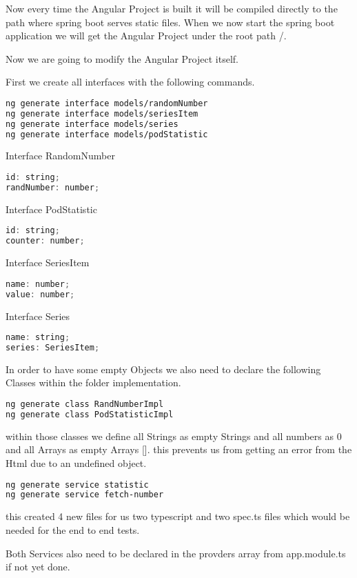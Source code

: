 Now every time the Angular Project is built it will be compiled directly to the path where spring boot serves static files.
When we now start the spring boot application we will get the Angular Project under the root path /.

Now we are going to modify the Angular Project itself.

First we create all interfaces with the following commands.
\begin{lstlisting}[language=Bash]
ng generate interface models/randomNumber
ng generate interface models/seriesItem
ng generate interface models/series
ng generate interface models/podStatistic
\end{lstlisting}

Interface RandomNumber
\begin{lstlisting}[language=Java]
id: string;
randNumber: number;
\end{lstlisting}

Interface PodStatistic
\begin{lstlisting}[language=Java]
id: string;
counter: number;
\end{lstlisting}

Interface SeriesItem
\begin{lstlisting}[language=Java]
name: number;
value: number;
\end{lstlisting}

Interface Series
\begin{lstlisting}[language=Java]
name: string;
series: SeriesItem;
\end{lstlisting}

In order to have some empty Objects we also need to declare the following Classes within the folder implementation.

\begin{lstlisting}[language=Bash]
ng generate class RandNumberImpl
ng generate class PodStatisticImpl
\end{lstlisting}
within those classes we define all Strings as empty Strings and all numbers as 0 and all Arrays as empty Arrays [].
this prevents us from getting an error from the Html due to an undefined object.

\begin{lstlisting}[language=Bash]
ng generate service statistic
ng generate service fetch-number
\end{lstlisting}
this created 4 new files for us two typescript and two spec.ts files which would be needed for the end to end tests.

Both Services also need to be declared in the provders array from app.module.ts if not yet done.

